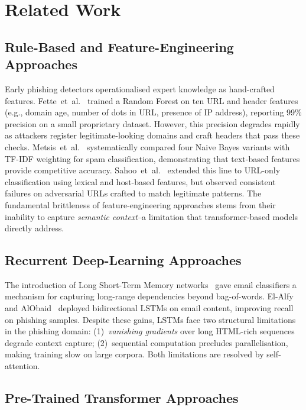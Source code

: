 \documentclass[sigconf, nonacm]{acmart}
\begin{document}
\section{Related Work}

\subsection{Rule-Based and Feature-Engineering Approaches}

Early phishing detectors operationalised expert knowledge as
hand-crafted features.
Fette~et~al.~\cite{fette2007} trained a Random Forest on ten URL and
header features (e.g., domain age, number of dots in URL, presence of
IP address), reporting 99\% precision on a small proprietary dataset.
However, this precision degrades rapidly as attackers register
legitimate-looking domains and craft headers that pass these checks.
Metsis~et~al.~\cite{metsis2006} systematically compared four Naive
Bayes variants with TF-IDF weighting for spam classification,
demonstrating that text-based features provide competitive accuracy.
Sahoo~et~al.~\cite{sahoo2017} extended this line to URL-only
classification using lexical and host-based features, but observed
consistent failures on adversarial URLs crafted to match legitimate
patterns.
The fundamental brittleness of feature-engineering approaches stems
from their inability to capture \emph{semantic context}--a limitation
that transformer-based models directly address.

\subsection{Recurrent Deep-Learning Approaches}

The introduction of Long Short-Term Memory
networks~\cite{hochreiter1997} gave email classifiers a mechanism for
capturing long-range dependencies beyond bag-of-words.
El-Alfy and AlObaid~\cite{elalfy2017} deployed bidirectional LSTMs on
email content, improving recall on phishing samples.
Despite these gains, LSTMs face two structural limitations in the
phishing domain: (1)~\emph{vanishing gradients} over long HTML-rich
sequences degrade context capture; (2)~sequential computation
precludes parallelisation, making training slow on large corpora.
Both limitations are resolved by self-attention.

\subsection{Pre-Trained Transformer Approaches}
\end{document}
